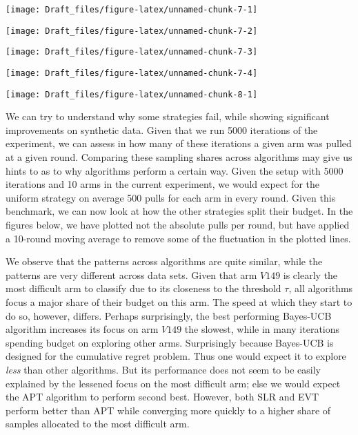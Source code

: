 \documentclass[12pt,]{article}
\begin{document}
\begin{center}\texttt{[image: Draft\_files/figure-latex/unnamed-chunk-7-1]} \end{center}

\begin{center}\texttt{[image: Draft\_files/figure-latex/unnamed-chunk-7-2]} \end{center}

\begin{center}\texttt{[image: Draft\_files/figure-latex/unnamed-chunk-7-3]} \end{center}

\begin{center}\texttt{[image: Draft\_files/figure-latex/unnamed-chunk-7-4]} \end{center}

\begin{center}\texttt{[image: Draft\_files/figure-latex/unnamed-chunk-8-1]} \end{center}

We can try to understand why some strategies fail, while showing
significant improvements on synthetic data. Given that we run 5000
iterations of the experiment, we can assess in how many of these
iterations a given arm was pulled at a given round. Comparing these
sampling shares across algorithms may give us hints to as to why
algorithms perform a certain way. Given the setup with 5000 iterations
and 10 arms in the current experiment, we would expect for the uniform
strategy on average 500 pulls for each arm in every round. Given this
benchmark, we can now look at how the other strategies split their
budget. In the figures below, we have plotted not the absolute pulls per
round, but have applied a 10-round moving average to remove some of the
fluctuation in the plotted lines.

We observe that the patterns across algorithms are quite similar, while
the patterns are very different across data sets. Given that arm
\(V149\) is clearly the most difficult arm to classify due to its
closeness to the threshold \(\tau\), all algorithms focus a major share
of their budget on this arm. The speed at which they start to do so,
however, differs. Perhaps surprisingly, the best performing Bayes-UCB
algorithm increases its focus on arm \(V149\) the slowest, while in many
iterations spending budget on exploring other arms. Surprisingly because
Bayes-UCB is designed for the cumulative regret problem. Thus one would
expect it to explore \emph{less} than other algorithms. But its
performance does not seem to be easily explained by the lessened focus
on the most difficult arm; else we would expect the APT algorithm to
perform second best. However, both SLR and EVT perform better than APT
while converging more quickly to a higher share of samples allocated to
the most difficult arm.
\end{document}

